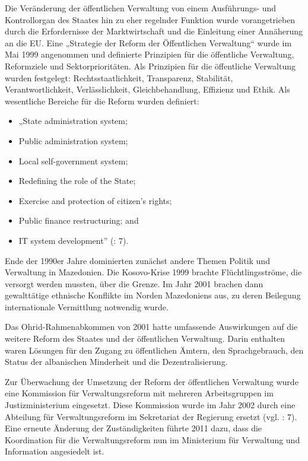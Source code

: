 Die Veränderung der öffentlichen Verwaltung von einem Ausführungs- und Kontrollorgan des Staates hin zu eher regelnder Funktion wurde vorangetrieben durch die Erfordernisse der Marktwirtschaft und die Einleitung einer Annäherung an die EU. Eine „Strategie der Reform der Öffentlichen Verwaltung“ wurde im Mai 1999 angenommen und definierte Prinzipien für die öffentliche Verwaltung, Reformziele und Sektorprioritäten. Als Prinzipien für die öffentliche Verwaltung wurden festgelegt: Rechtsstaatlichkeit, Transparenz, Stabilität, Verantwortlichkeit, Verlässlichkeit, Gleichbehandlung, Effizienz und Ethik.
Als wesentliche Bereiche für die Reform wurden definiert:
\begin{itemize} \itemsep1pt \parskip0pt 
\item „State administration system;
\item Public administration system;
\item Local self-government system;
\item Redefining the role of the State;
\item Exercise and protection of citizen’s rights;
\item Public finance restructuring; and
\item IT system development” (\cite{analyt07}: 7).
\end{itemize}
Ende der 1990er Jahre dominierten zunächst andere Themen Politik und Verwaltung in Mazedonien. Die Kosovo-Krise 1999 brachte Flüchtlingsströme, die versorgt werden mussten, über die Grenze. Im Jahr 2001 brachen dann gewalttätige ethnische Konflikte im Norden Mazedoniens aus, zu deren Beilegung internationale Vermittlung notwendig wurde. \par
Das Ohrid-Rahmenabkommen von 2001 hatte umfassende Auswirkungen auf die weitere Reform des Staates und der öffentlichen Verwaltung. Darin enthalten waren Lösungen für den Zugang zu öffentlichen Ämtern, den Sprachgebrauch, den Status der albanischen Minderheit und die Dezentralisierung.\par
Zur Überwachung der Umsetzung der Reform der öffentlichen Verwaltung wurde eine Kommission für Verwaltungsreform mit mehreren Arbeitsgruppen im Justizministerium eingesetzt. Diese Kommission wurde im Jahr 2002 durch eine Abteilung für Verwaltungsreform im Sekretariat der Regierung ersetzt (vgl. \cite{analyt07}: 7). Eine erneute Änderung der Zuständigkeiten führte 2011 dazu, dass die Koordination für die Verwaltungsreform nun im Ministerium für Verwaltung und Information angesiedelt ist.\par
